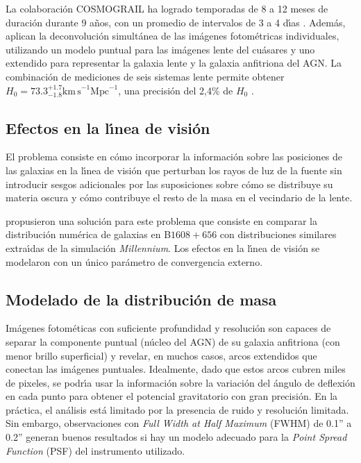 \documentclass[baaa]{baaa}
\begin{document}
La colaboraci\'on COSMOGRAIL ha logrado temporadas de 8 a 12 meses de duraci\'on durante 9 a\~nos, con un promedio de intervalos de 3 a 4 d\'{\i}as \citep{treu2016}. Adem\'as, aplican la deconvoluci\'on simult\'anea de las im\'agenes fotom\'etricas individuales, utilizando un modelo puntual para las im\'agenes lente del cu\'asares y uno extendido para representar la galaxia lente y la galaxia anfitriona del AGN. La combinaci\'on de mediciones de seis sistemas lente permite obtener $H_0 =73.3^{+1.7}_{-1.8} \mathrm{km\, s}^{-1} \mathrm{Mpc}^{-1}$, una precisi\'on del 2,4\% de $H_0$ \citep{wong2020}.

\subsection{Efectos en la l\'{\i}nea de visi\'on}

El problema consiste en c\'omo incorporar la informaci\'on sobre las posiciones de las galaxias en la l\'{\i}nea de visi\'on que perturban los rayos de luz de la fuente sin introducir sesgos adicionales por las suposiciones sobre c\'omo se distribuye su materia oscura y c\'omo contribuye el resto de la masa en el vecindario de la lente.

\cite{suyu2010} propusieron una soluci\'on para este problema que consiste en comparar la distribuci\'on num\'erica de galaxias en B$1608+656$ con distribuciones similares extra\'{\i}das de la simulaci\'on {\em Millennium}. Los efectos en la l\'{\i}nea de visi\'on se modelaron con un \'unico par\'ametro de convergencia externo. 


\subsection{Modelado de la distribuci\'on de masa}

Im\'agenes fotom\'eticas con suficiente profundidad y resoluci\'on son capaces de separar la componente puntual (n\'ucleo del AGN) de su galaxia anfitriona (con menor brillo superficial) y revelar, en muchos casos, arcos extendidos que conectan las im\'agenes puntuales.
Idealmente, dado que estos arcos cubren miles de pixeles, se podr\'{\i}a usar la informaci\'on sobre la variaci\'on del \'angulo de deflexi\'on en cada punto para obtener el potencial gravitatorio con gran precisi\'on. 
En la práctica, el an\'alisis est\'a limitado por la presencia de ruido y  resolución limitada.  Sin embargo, observaciones con {\em Full Width at Half Maximum} (FWHM) de 0.1'' a 0.2'' generan buenos resultados si hay un modelo adecuado para la {\em Point Spread Function} (PSF) del instrumento utilizado. 
\end{document}
